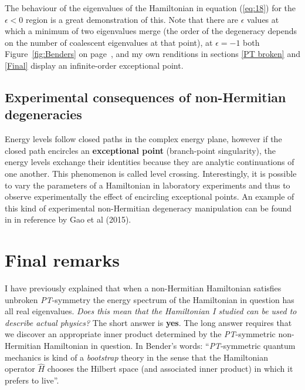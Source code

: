 \documentclass[10pt, a4paper, singlespacing]{report}
\newcommand\PT{\emph{PT}}
\begin{document}
The behaviour of the eigenvalues of the Hamiltonian in equation (\ref{eq:18}) for the $\epsilon < 0$ region is a great demonstration of this. Note that there are $\epsilon$ values at which a minimum of two eigenvalues merge (the order of the degeneracy depends on the number of coalescent eigenvalues at that point\cite{BenderPT}\cite{Bender2017}), at $\epsilon = -1$ both Figure~\ref{fig:Benders} on page~\pageref{fig:Benders}, and my own renditions in sections \ref{PT broken} and \ref{Final} display an infinite-order exceptional point.

\subsection{Experimental consequences of non-Hermitian degeneracies}\label{Experimental}
Energy levels follow closed paths in the complex energy plane, however if the closed path encircles an \textbf{exceptional point} (branch-point singularity), the energy levels exchange their identities because they are analytic continuations of one another\cite{BenderPT}\cite{Bender2017}. This phenomenon is called level crossing. Interestingly, it is possible to vary the parameters of a Hamiltonian in laboratory experiments and thus to observe experimentally the effect of encircling exceptional points\cite{Bender2017}. An example of this kind of experimental non-Hermitian degeneracy manipulation can be found in in reference \cite{Ostrovskaya} by Gao et al (2015).

\section{Final remarks}\label{Future}
I have previously explained that when a non-Hermitian Hamiltonian satisfies unbroken \PT-symmetry the energy spectrum of the Hamiltonian in question has all real eigenvalues. \emph{Does this mean that the Hamiltonian I studied can be used to describe actual physics?} The short answer is \textbf{yes}. The long answer requires that we discover an appropriate inner product determined by the \PT-symmetric non-Hermitian Hamiltonian in question. In Bender's words: ``\PT-symmetric quantum mechanics is kind of a \emph{bootstrap} theory in the sense that the Hamiltonian operator $\hat{H}$ chooses the Hilbert space (and associated inner product) in which it prefers to live''\cite{BenderPT}.
\end{document}
